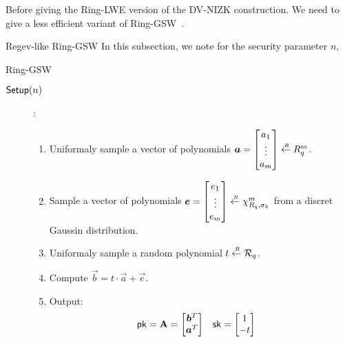 
Before giving the Ring-LWE version of the DV-NIZK construction.
We need to give a less efficient variant of Ring-GSW~\cite{DBLP:journals/tc/KhedrGV16}.

\begin{subsection}{Regev-like Ring-GSW}
  In this subsection, we note for the security parameter $n$,
  \begin{paragraph}{Ring-GSW}
    \begin{description}
    \item[${\mathsf{Setup}}(n)$]:
      \begin{enumerate}
      \item Uniformaly sample a vector of polynomials $\vec{a} = \begin{bmatrix} a_1 \\ \vdots \\ a_m \end{bmatrix} \sample R_q^m$.
      \item Sample a vector of polynomials $\vec{e} = \begin{bmatrix} e_1 \\ \vdots \\ e_m \end{bmatrix} \sample \chi_{R_q, \sigma_k}^m$ from a discret Gaussin distribution.
      \item Uniformaly sample a random polynomial $t \stackrel{{\scriptscriptstyle \mkern4mu R}}{\gets} {\mathcal{R}}_q$.
      \item Compute $\vec{b} = t \cdot \vec{a} + \vec{e}$.
      \item Output:
        \begin{align*}
          \pk &= \mat{A} = \begin{bmatrix} \vec{b}^T \\ \vec{a}^T \end{bmatrix} & \sk &= \begin{bmatrix} 1 \\ -t\end{bmatrix}

\end{align*}
\end{enumerate}
\end{description}
\end{paragraph}
\end{subsection}

